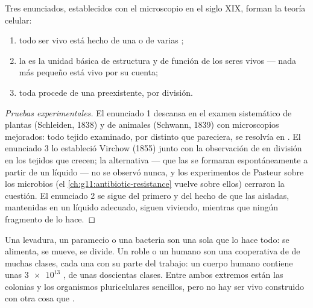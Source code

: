\begin{proposition}\label{prop:g10:cells-common-unit:theory}
Tres enunciados, establecidos con el microscopio en el siglo XIX,
forman la teoría celular:
\begin{enumerate}
  \item todo ser vivo está hecho de una o de varias ;
  \item la  es la unidad básica de estructura y de función de los
        seres vivos --- nada más pequeño está vivo por su cuenta;
  \item toda  procede de una  preexistente, por división.
\end{enumerate}
\end{proposition}
\begin{proof}[Pruebas experimentales]
El enunciado 1 descansa en el examen sistemático de plantas (Schleiden,
1838) y de animales (Schwann, 1839) con microscopios mejorados: todo
tejido examinado, por distinto que pareciera, se resolvía en .
El enunciado 3 lo estableció Virchow (1855) junto con la observación de
 en división en los tejidos que crecen; la alternativa --- que
las  se formaran espontáneamente a partir de un líquido --- no se
observó nunca, y los experimentos de Pasteur sobre los microbios (el
\cref{ch:g11:antibiotic-resistance} vuelve sobre ellos) cerraron la
cuestión. El enunciado 2 se sigue del primero y del hecho de que las
 aisladas, mantenidas en un líquido adecuado, siguen viviendo,
mientras que ningún fragmento de  lo hace.
\end{proof}

\begin{example}\label{ex:g10:cells-common-unit:onemany}
Una levadura, un paramecio o una bacteria son una sola  que lo
hace todo: se alimenta, se mueve, se divide. Un roble o un humano son
una cooperativa de  de muchas clases, cada una con su parte del
trabajo: un cuerpo humano contiene unas $\num{3e13}$ , de unas
doscientas clases. Entre ambos extremos están las colonias y los
organismos pluricelulares sencillos, pero no hay ser vivo construido
con otra cosa que .
\end{example}

